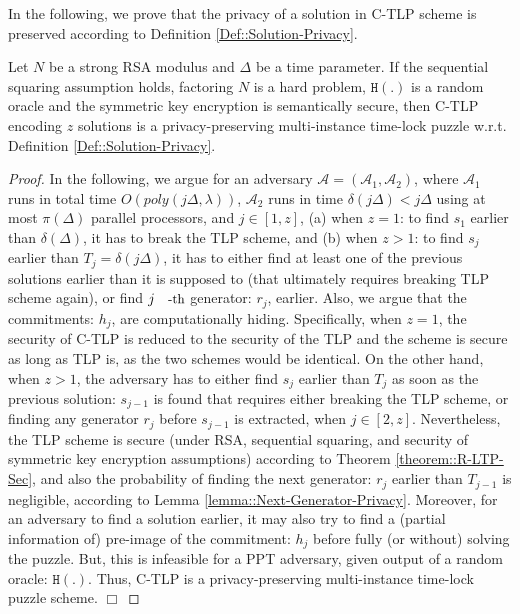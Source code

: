  In the following, we prove that the privacy of a solution in C-TLP scheme is preserved according to Definition \ref{Def::Solution-Privacy}. 
 
 
 \begin{theorem} \label{Solution-Privacy} Let $N$ be a  strong RSA modulus and $\Delta$ be a time parameter. If the sequential squaring assumption holds,  factoring $N$ is a hard problem, $\mathtt{H}(.)$ is a random oracle and the symmetric key encryption is  semantically secure, then  C-TLP encoding $z$ solutions is a privacy-preserving multi-instance time-lock puzzle w.r.t. Definition \ref{Def::Solution-Privacy}.
 \end{theorem}
  \begin{proof} In the following, we argue  for an adversary $\mathcal{A}=(\mathcal{A}_{\scriptscriptstyle 1},\mathcal{A}_{\scriptscriptstyle 2})$, where $\mathcal{A}_{\scriptscriptstyle 1}$ runs in total time $O(poly(j\Delta,\lambda))$,  $\mathcal{A}_{\scriptscriptstyle 2}$ runs in  time $\delta(j\Delta)<j\Delta$ using at most $\pi(\Delta)$ parallel processors, and  $j\in [1,z]$,  (a) when $z=1$: to find $s_{\scriptscriptstyle 1}$ earlier than $\delta(\Delta)$,  it has to  break the TLP scheme, and (b) when $z>1$: to find $s_{\scriptscriptstyle j}$ earlier than $T_{\scriptscriptstyle j}=\delta(j\Delta)$, it has to either find   at least one of the previous solutions earlier than it is supposed to (that ultimately requires breaking TLP scheme again), or find $j\text{\small{-th}}$ generator: $r_{\scriptscriptstyle j}$, earlier. Also, we argue that the commitments: $h_{\scriptscriptstyle j}$, are computationally hiding.   Specifically, when $z=1$, the security of C-TLP is reduced to the security of  the TLP and the scheme is secure as long as TLP is, as the two schemes would be identical. On the other hand, when $z>1$, the adversary has to either find $s_{\scriptscriptstyle j}$ earlier than $T_{\scriptscriptstyle j}$ as soon as the previous solution: $s_{\scriptscriptstyle j-1}$ is found that requires either breaking the TLP scheme, or finding any generator $r_{\scriptscriptstyle j}$  before $s_{\scriptscriptstyle j-1}$ is extracted, when $j\in [2,z]$. Nevertheless, the TLP scheme is secure (under RSA,  sequential squaring, and security of symmetric key encryption assumptions) according to  Theorem \ref{theorem::R-LTP-Sec}, and also the probability of finding the next generator: $r_{\scriptscriptstyle j}$ earlier than $T_{\scriptscriptstyle j-1}$ is negligible, according to Lemma \ref{lemma::Next-Generator-Privacy}. Moreover, for an adversary to find a solution earlier, it may also try to find a (partial information of) pre-image of the commitment: $h_{\scriptscriptstyle j}$ before fully (or without) solving the puzzle. But, this is infeasible for a PPT adversary, given  output of a random oracle: $\mathtt{H}(.)$. Thus, C-TLP is a privacy-preserving multi-instance time-lock puzzle scheme.  \hfill\(\Box\)
  \end{proof}
 
